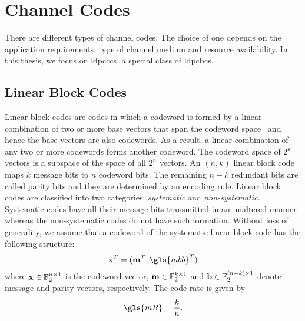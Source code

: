 \section{Channel Codes}
There are different types of channel codes. The choice of one depends on the application requirements, type of channel medium and resource availability. In this thesis, we focus on \glspl{ldpccc}, a special class of \glspl{ldpcbc}.
\subsection{Linear Block Codes}
Linear block codes are codes in which a codeword is formed by a linear combination of two or more base vectors that span the codeword space~\cite{proak} and hence the base vectors are also codewords. As a result, a linear combination of any two or more codewords forms another codeword. The codeword space of $2^k$ vectors is a subspace of the space of all $2^n$ vectors. An $(n,k)$ linear block code maps $k$ message bits to $n$ codeword bits. The remaining $n-k$ redundant bits are called parity bits and they are determined by an encoding rule. Linear block codes are classified into two categories: \emph{systematic} and \emph{non-systematic}. Systematic codes have all their message bits transmitted in an unaltered manner whereas the non-systematic codes do not have such formation. Without loss of generality, we assume that a codeword of the systematic linear block code has the following structure: \begin{align}\x^T=(\m^T,\gls{mbb}^T)\end{align} where $\mathbf{x}\in\mathbb{F}_2^{n\times 1}$ is the codeword vector, $\mathbf{m}\in\mathbb{F}_2^{k\times 1}$ and $\mathbf{b}\in\mathbb{F}_2^{(n-k)\times 1}$ denote message and parity vectors, respectively. The code rate is given by \begin{align}\gls{mR}=\frac{k}{n}.\end{align}

